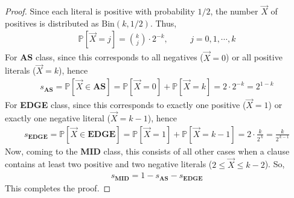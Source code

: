 \documentclass[10pt,a4paper]{amsart}
\newcommand\pr{\mathbb{P}}
\newcommand\vX{\vec X}
\renewcommand\Pr{\pr}
\begin{document}
	\begin{proof}
		Since each literal is positive with probability $1/2$, the number $\vX$ of positives is distributed as $\mathrm{Bin}(k,1/2)$. Thus,
		\begin{align*}
			\pr[\vX=j]=\binom{k}{j}\cdot2^{-k}, && \quad j=0,1,\cdots,k
		\end{align*}
		For \textbf{AS} class, since this corresponds to all negatives ($\vX=0$) or all positive literals ($\vX=k$), hence
		\begin{align*}
			s_{\mathrm{\textbf{AS}}}=
			\Pr[\vX\in\textbf{AS}]=\Pr[\vX=0]+\Pr[\vX=k]
			=2\cdot 2^{-k}=2^{1-k}
		\end{align*}
		For \textbf{EDGE} class, since this corresponds to exactly one positive ($\vX=1$) or exactly one negative literal ($\vX=k-1$), hence
		\begin{align*}
			s_{\mathrm{\textbf{EDGE}}}=
			\Pr[\vX\in\textbf{EDGE}]=\Pr[\vX=1]+\Pr[\vX=k-1]
			=2\cdot \frac{k}{2^{\,k}}=\frac{k}{2^{\,k-1}} 
		\end{align*}
		Now, coming to the \textbf{MID} class, this consists of all other cases when a clause contains at least two positive and two negative literals ($2\leq\vX\leq k-2$).
		So,
		\begin{align*}
			s_{\mathrm{\textbf{MID}}}=1-s_{\mathrm{\textbf{AS}}}-s_{\mathrm{\textbf{EDGE}}}
		\end{align*} 
		This completes the proof.
	\end{proof}
\end{document}

